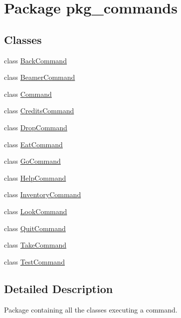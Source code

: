 \hypertarget{namespacepkg__commands}{\section{Package pkg\-\_\-commands}
\label{namespacepkg__commands}
}
\subsection*{Classes}
\begin{DoxyCompactItemize}
\item 
class \hyperlink{classpkg__commands_1_1BackCommand}{Back\-Command}
\item 
class \hyperlink{classpkg__commands_1_1BeamerCommand}{Beamer\-Command}
\item 
class \hyperlink{classpkg__commands_1_1Command}{Command}
\item 
class \hyperlink{classpkg__commands_1_1CreditsCommand}{Credits\-Command}
\item 
class \hyperlink{classpkg__commands_1_1DropCommand}{Drop\-Command}
\item 
class \hyperlink{classpkg__commands_1_1EatCommand}{Eat\-Command}
\item 
class \hyperlink{classpkg__commands_1_1GoCommand}{Go\-Command}
\item 
class \hyperlink{classpkg__commands_1_1HelpCommand}{Help\-Command}
\item 
class \hyperlink{classpkg__commands_1_1InventoryCommand}{Inventory\-Command}
\item 
class \hyperlink{classpkg__commands_1_1LookCommand}{Look\-Command}
\item 
class \hyperlink{classpkg__commands_1_1QuitCommand}{Quit\-Command}
\item 
class \hyperlink{classpkg__commands_1_1TakeCommand}{Take\-Command}
\item 
class \hyperlink{classpkg__commands_1_1TestCommand}{Test\-Command}
\end{DoxyCompactItemize}


\subsection{Detailed Description}
Package containing all the classes executing a command. 